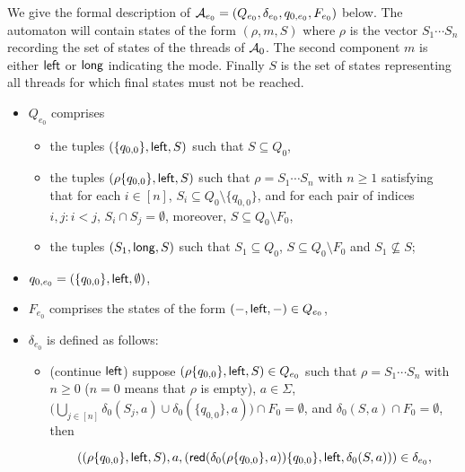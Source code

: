 We give the formal description of $\mathcal{A}_{e_0}=(Q_{e_0}, \delta_{e_0}, q_{0,e_0}, F_{e_0})$ below.
The automaton will contain states of the form $(\rho, m, S)$ where $\rho$ is the vector $S_1\cdots S_n$ recording the set of states of the threads of $\mathcal{A}_0$. The second component $m$ is either $\mathsf{left}$ or $\mathsf{long}$ indicating the mode.
Finally $S$ is the set of states representing all threads for which final states must not be reached.
\begin{itemize}
	\item $Q_{e_0}$ comprises
	\begin{itemize}
		\item the tuples $(\{q_{0,0}\}, \mathsf{left}, S)$ such that $S \subseteq Q_0$,
		\item the tuples $(\rho \{q_{0,0}\}, \mathsf{left}, S)$ such that  $\rho = S_1 \cdots S_n$ with $n \ge 1$ satisfying that for each $i \in [n]$, $S_i \subseteq Q_0 \setminus \{q_{0,0}\}$, and for each pair of indices $i, j: i < j$, $S_i \cap S_j = \emptyset$, moreover, $S \subseteq Q_0 \setminus F_0$,
		\item the tuples $(S_1, \mathsf{long}, S)$ such that $S_1 \subseteq Q_0$, $S \subseteq Q_0 \setminus F_0$ and $S_1 \not \subseteq S$;
	\end{itemize}
	\item $q_{0,e_0}= (\{q_{0,0}\}, \mathsf{left}, \emptyset)$,
	\item $F_{e_0}$ comprises the states of the form $(-, \mathsf{left}, -) \in Q_{e_0}$,
	\item $\delta_{e_0}$ is defined as follows:
	\begin{itemize}
		\item (continue $\mathsf{left}$) suppose $(\rho \{q_{0,0}\}, \mathsf{left}, S) \in Q_{e_0}$ such that $\rho = S_1 \cdots S_n$ with $n \ge 0$  ($n = 0$ means that $\rho$ is empty), $a \in \Sigma$, $\big(\bigcup \limits_{j \in [n]} \delta_0(S_j, a) \cup \delta_0(\{q_{0,0}\},a)\big) \cap F_0 = \emptyset$, and $\delta_0(S,a) \cap F_0 = \emptyset$, then

		$$\left((\rho  \{q_{0,0}\}, \mathsf{left}, S), a, \left(\mathsf{red}(\delta_0(\rho\{q_{0,0}\}, a)) \{q_{0,0}\}, \mathsf{left}, \delta_0(S,a) \right) \right) \in \delta_{e_0},$$


\end{itemize}
\end{itemize}
